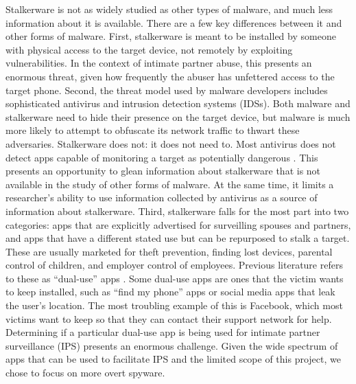 \documentclass[acmtog]{acmart}
\begin{document}
Stalkerware is not as widely studied as other types of malware, and much less 
information about it is available. There are a few key differences between it 
and other forms of malware. First, stalkerware is meant to be installed 
by someone with physical access to the target device, not remotely by 
exploiting vulnerabilities. In the 
context of intimate partner abuse, this presents an enormous 
threat, given how frequently the abuser has unfettered access to the target 
phone. Second, the 
threat model used by malware developers includes sophisticated antivirus and 
intrusion detection systems (IDSs). Both malware and stalkerware need to hide 
their presence on the target device, but malware is much more likely to 
attempt to obfuscate its network traffic to thwart these adversaries. 
Stalkerware does not: it does not 
need to. Most antivirus does not detect apps capable of monitoring a target as 
potentially dangerous \cite{chatterjee_spyware_2018}. This presents an 
opportunity to glean information about stalkerware that is not available in the 
study of other forms of malware. At the same time, it limits a researcher's 
ability to use information collected by antivirus as a source of information 
about stalkerware. Third, stalkerware falls 
for the most part into two categories: apps that are explicitly advertised for 
surveilling spouses and partners, and apps that have a different stated use but 
can be repurposed to stalk a target. These are usually marketed for theft 
prevention, finding lost devices, parental control of children, and employer 
control of employees. Previous literature refers to these as ``dual-use'' 
apps \cite{chatterjee_spyware_2018}. Some dual-use apps are ones that the 
victim wants to keep installed, such as 
``find my phone'' apps or social media apps that leak the user's location. The 
most troubling example of this is Facebook, which most victims want to keep 
so that they can contact their support network for help.  Determining if a 
particular dual-use app is being used for intimate partner surveillance (IPS) 
presents an enormous challenge. Given the wide spectrum of apps that can be 
used to facilitate IPS and the limited scope of this project, we chose to focus 
on more overt spyware.
\end{document}
